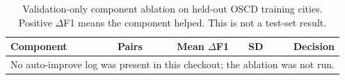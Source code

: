 \begin{table}[t]
\centering
\caption{Validation-only component ablation on held-out OSCD training cities. Positive $\Delta$F1 means the component helped. This is not a test-set result.}
\label{tab:ablation}
\small
\begin{tabular}{lrrrr}
\toprule
Component & Pairs & Mean $\Delta$F1 & SD & Decision \\
\midrule
\multicolumn{5}{c}{No auto-improve log was present in this checkout; the ablation was not run.} \\
\bottomrule
\end{tabular}
\end{table}
